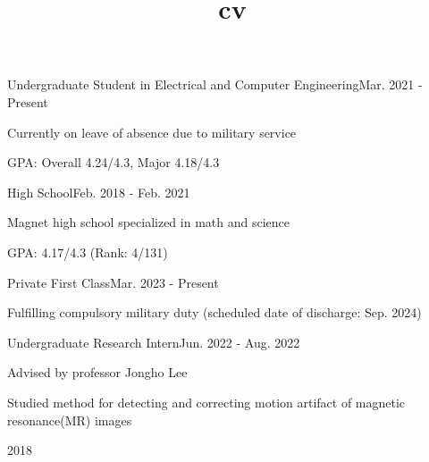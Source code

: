 \documentclass{cv}
\title{cv}
\begin{document}
\cvheader






{Undergraduate Student in Electrical and Computer Engineering}{Mar. 2021 - Present}
{
    \item Currently on leave of absence due to military service
    \item GPA: Overall 4.24/4.3, Major 4.18/4.3
}
{High School}{Feb. 2018 - Feb. 2021}
{
    \item Magnet high school specialized in math and science
    \item GPA: 4.17/4.3 (Rank: 4/131)
}


{Private First Class}{Mar. 2023 - Present}
{
    \item Fulfilling compulsory military duty (scheduled date of discharge: Sep. 2024)
}

{Undergraduate Research Intern}{Jun. 2022 - Aug. 2022}
{
    \item Advised by professor Jongho Lee
    \item Studied method for detecting and correcting motion artifact of magnetic resonance(MR) images
}
\begin{comment}
\cventry{Research \& Education Program (R\&E)}{Korea Science Academy}
{Title: On Wave Propagation in Hyperhelix Structures}{Mar. 2019 - Dec. 2019}
{
    \item Advised by Dr. Yongdeok Kim
    \item Implemented a mechanical wave simulator for curved waveguide using python %
    \item Gave a poster presentation at International Science Youth Forum (ISYF) @ Singapore 2020
}
\end{comment}
 {2018}
\end{document}
